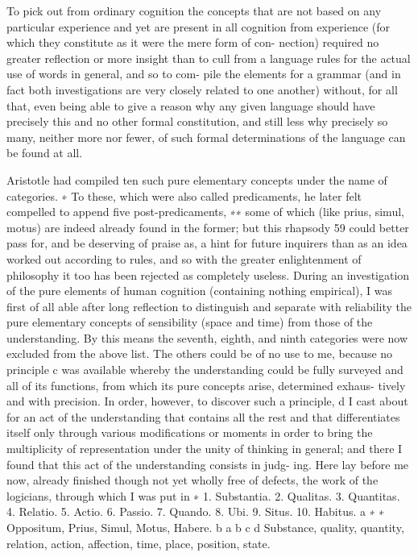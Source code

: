 To pick out from ordinary cognition the concepts that are not based
on any particular experience and yet are present in all cognition from
experience (for which they constitute as it were the mere form of con-
nection) required no greater reﬂection or more insight than to cull from
a language rules for the actual use of words in general, and so to com-
pile the elements for a grammar (and in fact both investigations are very
closely related to one another) without, for all that, even being able to
give a reason why any given language should have precisely this and no
other formal constitution, and still less why precisely so many, neither
more nor fewer, of such formal determinations of the language can be
found at all.

Aristotle had compiled ten such pure elementary concepts under the
name of categories. ∗ To these, which were also called predicaments, he
later felt compelled to append ﬁve post-predicaments, ∗∗ some of which
(like prius, simul, motus) are indeed already found in the former; but this
rhapsody 59 could better pass for, and be deserving of praise as, a hint for
future inquirers than as an idea worked out according to rules, and so
with the greater enlightenment of philosophy it too has been rejected as
completely useless.
During an investigation of the pure elements of human cognition
(containing nothing empirical), I was ﬁrst of all able after long reﬂection
to distinguish and separate with reliability the pure elementary concepts
of sensibility (space and time) from those of the understanding. By this
means the seventh, eighth, and ninth categories were now excluded from
the above list. The others could be of no use to me, because no principle c
was available whereby the understanding could be fully surveyed and all
of its functions, from which its pure concepts arise, determined exhaus-
tively and with precision.
In order, however, to discover such a principle, d I cast about for an
act of the understanding that contains all the rest and that differentiates
itself only through various modiﬁcations or moments in order to bring
the multiplicity of representation under the unity of thinking in general;
and there I found that this act of the understanding consists in judg-
ing. Here lay before me now, already ﬁnished though not yet wholly
free of defects, the work of the logicians, through which I was put in
∗
1. Substantia. 2. Qualitas. 3. Quantitas. 4. Relatio. 5. Actio. 6. Passio. 7. Quando.
8. Ubi. 9. Situs. 10. Habitus. a
∗ ∗ Oppositum, Prius, Simul, Motus, Habere. b
a
b
c
d
Substance, quality, quantity, relation, action, affection, time, place, position, state.
